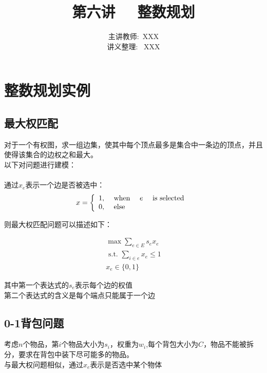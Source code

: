 \documentclass[11pt]{ctexart}
\title{\Huge 第六讲  \ \ 整数规划}
\author{主讲教师:\  XXX
\\ 讲义整理: \ XXX}
\begin{document}
\maketitle



\section{整数规划实例}

\subsection{最大权匹配}
对于一个有权图，求一组边集，使其中每个顶点最多是集合中一条边的顶点，并且使得该集合的边权之和最大。\\

以下对问题进行建模：\\
\\
通过$x_e$表示一个边是否被选中：\\

$$
x=\left\{\begin{array}{ll}
1, & \text { when \quad } e \text { \quad is selected } \\
0, & \text { else } 
\end{array}\right.
$$

则最大权匹配问题可以描述如下：

$$
\begin{array}{c}
\max \sum_{e \in E} s_{e}x_{e} \\
\text { s.t. } \sum_{i \in e} x_{e} \leq 1 \\
x_{e} \in\{0,1\}
\end{array}
$$

其中第一个表达式的$s_{e}$表示每个边的权值 \\

第二个表达式的含义是每个端点只能属于一个边 \\


\subsection{0-1背包问题}

考虑$n$个物品，第$i$个物品大小为$s_i$，权重为$w_i$,每个背包大小为$C$，物品不能被拆分，要求在背包中装下尽可能多的物品。\\

与最大权问题相似，通过$x_e$表示是否选中某个物体\\
\end{document}
